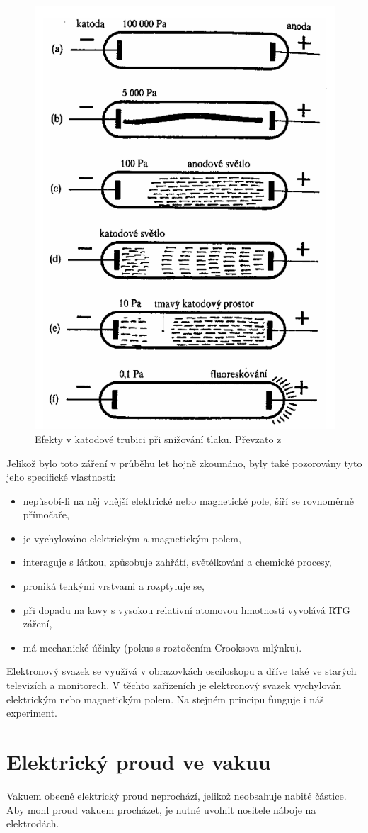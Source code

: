 \begin{figure}[htbp!]
\centering
\includegraphics[width = 170 pt]{Figure/01/katody.png}
\caption[Efekty v katodové trubici při snižování tlaku.]{Efekty v katodové trubici při snižování tlaku. Převzato z~\cite{Plyny}}
\label{01katody}
\end{figure}

Jelikož bylo toto záření v průběhu let hojně zkoumáno, byly také pozorovány tyto jeho specifické vlastnosti:
\begin{itemize}
\item nepůsobí-li na něj vnější elektrické nebo magnetické pole, šíří se rovnoměrně přímočaře,
\item je vychylováno elektrickým a magnetickým polem,
\item interaguje s látkou, způsobuje zahřátí, světélkování a chemické procesy,
\item proniká tenkými vrstvami a rozptyluje se,
\item při dopadu na kovy s vysokou relativní atomovou hmotností vyvolává RTG záření,
\item má mechanické účinky (pokus s roztočením Crooksova mlýnku).
\end{itemize}

Elektronový svazek se využívá v obrazovkách osciloskopu a dříve také ve starých televizích a monitorech. V těchto zařízeních je elektronový svazek vychylován elektrickým nebo magnetickým polem. Na stejném principu funguje i náš experiment.

\section{Elektrický proud ve vakuu}
Vakuem obecně elektrický proud neprochází, jelikož neobsahuje nabité částice. Aby mohl proud vakuem procházet, je nutné uvolnit nositele náboje na elektrodách.


